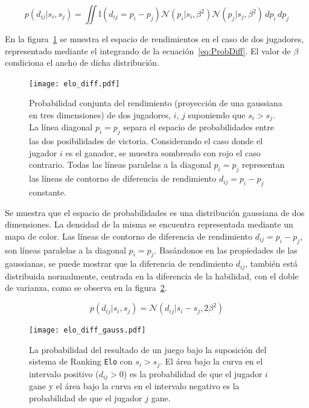 \documentclass[11pt,twoside,spanish]{report} %
\begin{document}
\begin{equation}\label{eq:ProbDiff}
p(d_{ij}|s_i,s_j) = \iint \mathbb{I}(d_{ij}=p_i -p_j) \mathcal{N}(p_i|s_i,\beta^2)\mathcal{N}(p_j|s_j,\beta^2) \, dp_i \, dp_j
\end{equation}

En la figura~\ref{fig:fig6} se muestra el espacio de rendimientos en el caso de dos jugadores, representado mediante el integrando de la ecuaci\'on~\ref{eq:ProbDiff}.
El valor de $\beta$ condiciona el ancho de dicha distribuci\'on.

\begin{figure}[H]
	\centering
	\texttt{[image: elo\_diff.pdf]}
	\caption{Probabilidad conjunta del rendimiento (proyecci\'on de una gaussiana en tres dimensiones) de dos jugadores, $i$, $j$ suponiendo que $s_i>s_j$. 
	La l\'inea diagonal $p_i=p_j$ separa el espacio de probabilidades entre las dos posibilidades de victoria.
	Considerando el caso donde el jugador $i$ es el ganador, se muestra sombreado con rojo el caso contrario.
	Todas las l\'ineas paralelas a la diagonal $p_i=p_j$ representan las l\'ineas de contorno de diferencia de rendimiento $d_{ij}=p_i-p_j$ constante.
	}
	\label{fig:fig6}
\end{figure}

Se muestra que el espacio de probabilidades es una distribuci\'on gaussiana de dos dimensiones.
La densidad de la misma se encuentra representada mediante un mapa de color.
Las l\'ineas de contorno de diferencia de rendimiento $d_{ij} = p_i-p_j$, son l\'ineas paralelas a la diagonal $p_i=p_j$.
Bas\'andonos en las propiedades de las gaussianas, se puede mostrar que la diferencia de rendimiento $d_{ij}$, tambi\'en est\'a distribuida normalmente, centrada en la diferencia de la habilidad, con el doble de varianza, como se observa en la figura~\ref{fig:fig7}.

\begin{equation}\label{eq:ProbDiff2}
p(d_{ij}|s_i,s_j) = \mathcal{N}(d_{ij}|s_i-s_j,2\beta^2)
\end{equation}

\begin{figure}[H]
	\centering
	\texttt{[image: elo\_diff\_gauss.pdf]}
	\caption{La probabilidad del resultado de un juego bajo la suposici\'on del sistema de Ranking \texttt{Elo} con $s_i>s_j$. El \'area bajo la curva en el intervalo positivo ($d_{ij} > 0$) es la probabilidad de que el jugador $i$ gane y el \'area bajo la curva en el intervalo negativo es la probabilidad de que el jugador $j$ gane.}
	\label{fig:fig7}
\end{figure}
\end{document}
